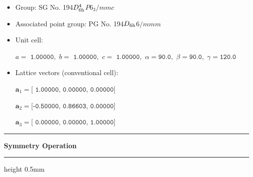 \documentclass[fleqn,10pt,landscape]{jsarticle}
\begin{document}
\begin{itemize}
\item Group: SG No. 194\quad$D_{\rm 6h}^{4}$\quad$P6_3/mmc$\quad[ hexagonal ]
\item Associated point group: PG No. 194\quad$D_{\rm 6h}$\quad$6/mmm$\quad[ hexagonal ]
\end{itemize}
\begin{itemize}
\item Unit cell:

\quad $a=\texttt{ 1.00000},\,\, b=\texttt{ 1.00000},\,\, c=\texttt{ 1.00000},\,\, \alpha=\texttt{90.0},\,\, \beta=\texttt{90.0},\,\, \gamma=\texttt{120.0}$

\item Lattice vectors (conventional cell):

\quad $\bm{a}_1=\texttt{[ 1.00000, 0.00000, 0.00000]}$

\quad $\bm{a}_2=\texttt{[-0.50000, 0.86603, 0.00000]}$

\quad $\bm{a}_3=\texttt{[ 0.00000, 0.00000, 1.00000]}$

\end{itemize}
\vspace{5mm}
\noindent \rule[0.5mm]{5mm}{0.5mm}\hspace{3mm}\textbf{Symmetry Operation}\hspace{3mm}\leaders\hrule height 0.5mm\hfill\kern0pt
\vspace{3mm}
\end{document}
